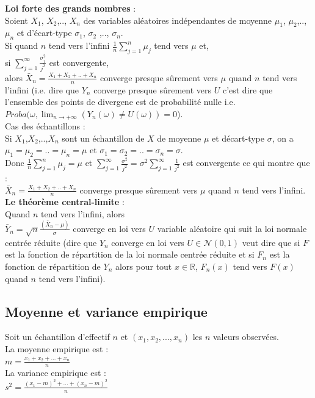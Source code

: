 \documentclass[a4paper,11pt]{book}
\begin{document}
{\bf Loi forte des grands nombres} :\\
Soient $X_1$, $X_2$,.., $X_n$ des variables al\'eatoires ind\'ependantes de 
moyenne $\mu_1$, $\mu_2$,.., $\mu_n$ et d'\'ecart-type $\sigma_1$, $\sigma_2$
,.., $\sigma_n$.\\
 Si quand $n$ tend vers l'infini $\frac{1}{n} \sum _{j=1}^n \mu_j $ tend vers 
$\mu$ et,\\
si $\sum _{j=1}^\infty \frac{\sigma_j^2}{j^2}$ est convergente,\\
alors  $\displaystyle  \bar X_n=\frac{X_1+X_2+..+X_n}{n}$ converge presque 
s\^urement vers $\mu$ quand $n$ tend vers l'infini (i.e. dire que $Y_n$ 
converge  presque s\^urement vers $U$ c'est dire que l'ensemble des points de 
divergene est de probabilit\'e nulle i.e.\\
 $Proba(\omega, \lim_{n \rightarrow +\infty}(Y_n(\omega) \neq U(\omega))=0$).\\
Cas des \'echantillons :\\
Si $X_1$,$X_2$,..,$X_n$ sont un \'echantillon de $X$ de moyenne $\mu$ et 
d\'ecart-type $\sigma$, on a $\mu_1=\mu_2=..=\mu_n=\mu$ et $\sigma_1= \sigma_2=..=\sigma_n=\sigma$.\\ 
Donc  $\frac{1}{n} \sum _{j=1}^n \mu_j =\mu$ et 
$\displaystyle\sum _{j=1}^\infty \frac{\sigma^2}{j^2} =\sigma^2\sum _{j=1}^\infty\frac{1}{j^2}$ est convergente ce qui montre que :\\
$\displaystyle \bar X_n=\frac{X_1+X_2+..+X_n}{n}$ converge presque s\^urement
 vers $\mu$ quand $n$ tend vers l'infini.\\
 
{\bf Le th\'eor\`eme central-limite} :\\
Quand $n$ tend vers l'infini, alors\\
$\displaystyle \bar Y_n=\sqrt n \frac{(\bar X_n-\mu)}{\sigma}$ converge en 
loi vers $U$ variable al\'eatoire qui suit la loi normale centr\'ee r\'eduite 
(dire que $Y_n$ converge en loi vers $U \in \mathcal N(0,1)$ veut dire que si 
$F$ est la fonction 
de r\'epartition de la loi normale centr\'ee r\'eduite et si $F_n$ est la 
fonction de r\'epartition de $Y_n$ alors pour tout $x\in \mathbb{R}$, $F_n(x)$
tend vers $F(x)$ quand $n$ tend vers l'infini).
\subsection{Moyenne et variance empirique}
Soit un  \'echantillon d'effectif $n$ et $(x_1,x_2,...,x_n)$ les $n$ valeurs
 observ\'ees. \\
La moyenne empirique est :\\
$\displaystyle m=\frac{x_1+x_2+...+x_n}{n}$\\
La variance empirique est :\\
$\displaystyle s^2=\frac{(x_1-m)^2+...+(x_n-m)^2}{n}$\\
\end{document}
